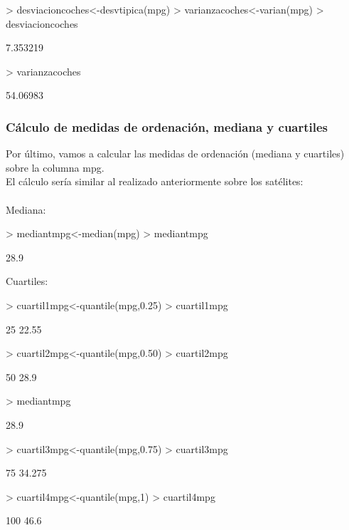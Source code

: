 \documentclass [a4paper] {article}
\begin{document}
\begin{Schunk}
\begin{Sinput}
> desviacioncoches<-desvtipica(mpg)
> varianzacoches<-varian(mpg)
> desviacioncoches
\end{Sinput}
\begin{Soutput}
[1] 7.353219
\end{Soutput}
\begin{Sinput}
> varianzacoches
\end{Sinput}
\begin{Soutput}
[1] 54.06983
\end{Soutput}
\end{Schunk}

\subsubsection{Cálculo de medidas de ordenación, mediana y cuartiles}
Por último, vamos a calcular las medidas de ordenación (mediana y cuartiles) sobre la columna
mpg.\\
El cálculo sería similar al realizado anteriormente sobre los satélites:\\\\
Mediana:

\begin{Schunk}
\begin{Sinput}
> mediantmpg<-median(mpg)
> mediantmpg
\end{Sinput}
\begin{Soutput}
[1] 28.9
\end{Soutput}
\end{Schunk}
Cuartiles:

\begin{Schunk}
\begin{Sinput}
> cuartil1mpg<-quantile(mpg,0.25)
> cuartil1mpg
\end{Sinput}
\begin{Soutput}
  25% 
22.55 
\end{Soutput}
\begin{Sinput}
> cuartil2mpg<-quantile(mpg,0.50)
> cuartil2mpg
\end{Sinput}
\begin{Soutput}
 50% 
28.9 
\end{Soutput}
\begin{Sinput}
> mediantmpg
\end{Sinput}
\begin{Soutput}
[1] 28.9
\end{Soutput}
\begin{Sinput}
> cuartil3mpg<-quantile(mpg,0.75)
> cuartil3mpg
\end{Sinput}
\begin{Soutput}
   75% 
34.275 
\end{Soutput}
\begin{Sinput}
> cuartil4mpg<-quantile(mpg,1)
> cuartil4mpg
\end{Sinput}
\begin{Soutput}
100% 
46.6 
\end{Soutput}
\end{Schunk}
\end{document}
